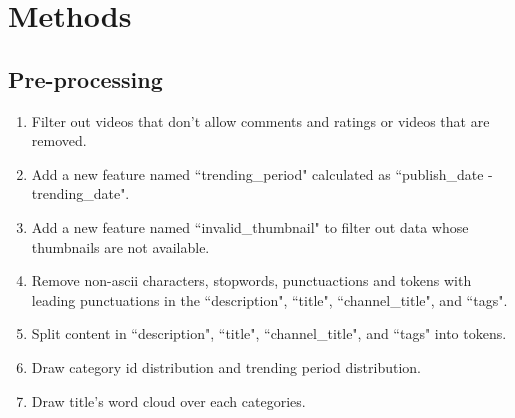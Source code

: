 \documentclass[english]{article}
\begin{document}
\section{Methods}
\begin{enumerate}
    
    \subsection{Pre-processing}
    \label{preprocess}
    \begin{enumerate}
    \item Filter out videos that don't allow comments and ratings or videos that are removed.
    \item Add a new feature named ``trending\_period" calculated as ``publish\_date - trending\_date".
    \item Add a new feature named ``invalid\_thumbnail" to filter out data whose thumbnails are not available.
    \item Remove non-ascii characters, stopwords, punctuactions and tokens with leading punctuations in the ``description", ``title", ``channel\_title", and ``tags".
    \item Split content in ``description", ``title", ``channel\_title", and ``tags" into tokens.
    \item Draw category id distribution and trending period distribution.
    \item Draw title's word cloud over each categories.\\

    \end{enumerate}
    

\end{enumerate}
\end{document}
